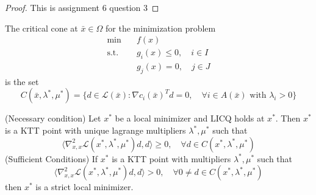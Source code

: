 \begin{proof}[Proof]
    This is assignment 6 question 3
\end{proof}
\begin{definition}
    The critical cone at $\bar x \in \Omega$ for the minimization problem 
    \begin{align*}
        \text{min} \quad &f(x) \\
        \text{s.t.} \quad &g_i(x) \leq 0, \quad i \in I \\
        &g_j(x) = 0, \quad j \in J
    \end{align*}
    is the set $$C(\bar x, \lambda^*, \mu^*) = \{d \in \mathcal L(\bar x): \nabla c_i(\bar x)^T d = 0, \quad \forall i \in A(\bar x) \text{ with } \lambda_i > 0\}$$
\end{definition}
\begin{theorem}
    (Necessary condition) Let $x^*$ be a local minimizer and LICQ holds at $x^*$. Then $x^*$ is a KTT point with unique lagrange multipliers $\lambda^*, \mu^*$ such that $$\langle \nabla^2_{x, x} \mathcal L(x^*, \lambda^*, \mu^*)d, d \rangle \geq 0, \quad \forall d \in C(x^*, \lambda^*, \mu^*)$$
    (Sufficient Conditions) If $x^*$ is a KTT point with multipliers $\lambda^*, \mu^*$ such that $$\langle \nabla^2_{x, x} \mathcal L(x^*, \lambda^*, \mu^*)d, d \rangle > 0, \quad \forall 0 \neq d \in C(x^*, \lambda^*, \mu^*)$$ then $x^*$ is a strict local minimizer. 
\end{theorem}
